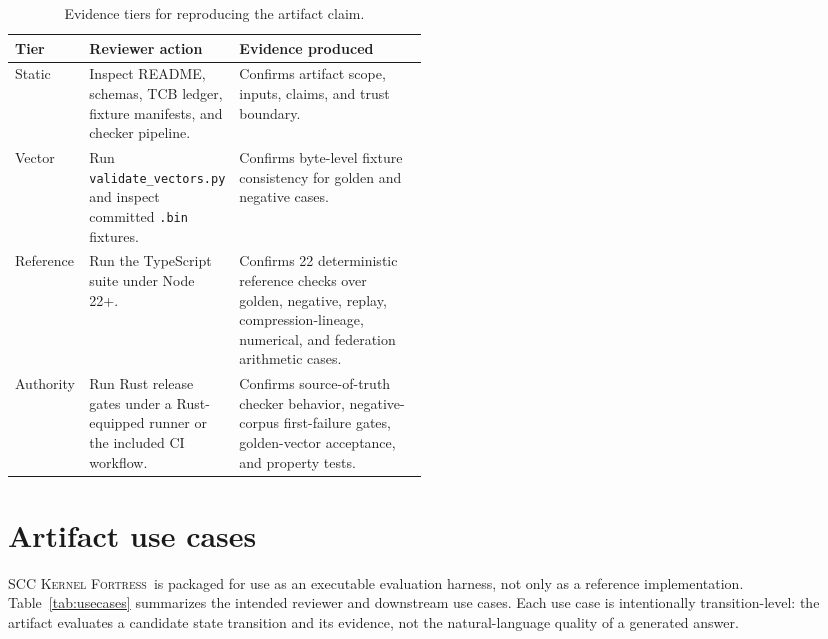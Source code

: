 \documentclass{article}
\newcommand{\KF}{\textsc{SCC Kernel Fortress}}
\newcommand{\gate}[1]{\texttt{\nolinkurl{#1}}}
\begin{document}
\begin{table}[h]
\caption{Evidence tiers for reproducing the artifact claim.}
\label{tab:evidence-tiers}
\centering
\footnotesize
\begin{tabularx}{\linewidth}{p{0.18\linewidth}p{0.30\linewidth}Y}
\toprule
Tier & Reviewer action & Evidence produced \\
\midrule
Static & Inspect README, schemas, TCB ledger, fixture manifests, and checker pipeline. & Confirms artifact scope, inputs, claims, and trust boundary. \\
Vector & Run \gate{validate_vectors.py} and inspect committed \gate{.bin} fixtures. & Confirms byte-level fixture consistency for golden and negative cases. \\
Reference & Run the TypeScript suite under Node 22+. & Confirms 22 deterministic reference checks over golden, negative, replay, compression-lineage, numerical, and federation arithmetic cases. \\
Authority & Run Rust release gates under a Rust-equipped runner or the included CI workflow. & Confirms source-of-truth checker behavior, negative-corpus first-failure gates, golden-vector acceptance, and property tests. \\
\bottomrule
\end{tabularx}
\end{table}

\section{Artifact use cases}
\label{sec:usecases}
\KF\ is packaged for use as an executable evaluation harness, not only as a reference implementation. Table~\ref{tab:usecases} summarizes the intended reviewer and downstream use cases. Each use case is intentionally transition-level: the artifact evaluates a candidate state transition and its evidence, not the natural-language quality of a generated answer.
\end{document}
